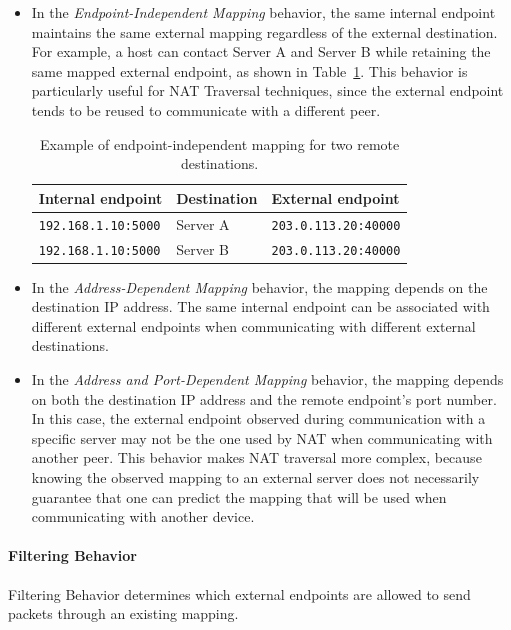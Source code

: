 \begin{itemize}
	\item In the \textit{Endpoint-Independent Mapping} behavior, the same internal endpoint maintains the same external mapping regardless of the external destination.
	      For example, a host can contact Server A and Server B while retaining the same mapped external  endpoint, as shown in Table~\ref{tab:endpoint-independent-mapping}. This behavior is particularly useful for NAT Traversal techniques, since the external endpoint tends to be reused to communicate with a different peer.
	      \begin{table}[htbp]
		      \centering
		      \caption{Example of endpoint-independent mapping for two remote destinations.}
		      \label{tab:endpoint-independent-mapping}
		      \begin{tabular}{lll}
			      \toprule
			      Internal endpoint          & Destination & External endpoint           \\
			      \midrule
			      \texttt{192.168.1.10:5000} & Server A    & \texttt{203.0.113.20:40000} \\
			      \texttt{192.168.1.10:5000} & Server B    & \texttt{203.0.113.20:40000} \\
			      \bottomrule
		      \end{tabular}
	      \end{table}

	\item In the \textit{Address-Dependent Mapping} behavior, the mapping depends on the destination IP address. The same internal endpoint can be associated with different external endpoints when communicating with different external destinations.

	\item In the \textit{Address and Port-Dependent Mapping} behavior, the mapping depends on both the destination IP address and the remote endpoint's port number. In this case, the external endpoint observed during communication with a specific server
	      may not be the one used by NAT when communicating with another peer.
	      This behavior makes NAT traversal more complex, because knowing the observed mapping to an external server does not necessarily guarantee that one can predict the mapping that will be used when communicating with another device.

\end{itemize}

\paragraph{Filtering Behavior}
Filtering Behavior determines which external endpoints are allowed to send packets through an existing mapping.

